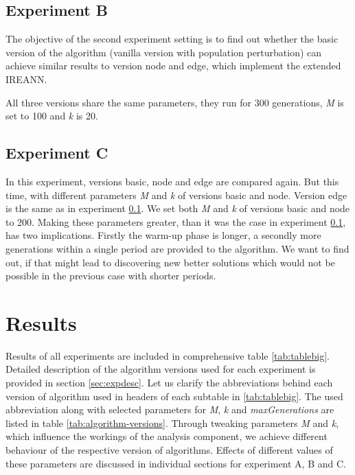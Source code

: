 \documentclass[twoside]{ctuthesis}
\theoremstyle{plain}
\theoremstyle{definition}
\theoremstyle{note}
\begin{document}
\subsection{Experiment B}
\label{sec:expb}

The objective of the second experiment setting is to find out whether the basic version of the algorithm (vanilla version with population perturbation) can achieve similar results to version node and edge, which implement the extended IREANN.

All three versions share the same parameters, they run for 300 generations, \emph{M} is set to 100 and \emph{k} is 20.

\subsection{Experiment C}

In this experiment, versions basic, node and edge are compared again. But this time, with different parameters \emph{M} and \emph{k} of versions basic and node. Version edge is the same as in experiment \ref{sec:expb}. We set both \emph{M} and \emph{k} of versions basic and node to 200. Making these parameters greater, than it was the case in experiment \ref{sec:expb}, has two implications. Firstly the warm-up phase is longer, a secondly more generations within a single period are provided to the algorithm. We want to find out, if that might lead to discovering new better solutions which would not be possible in the previous case with shorter periods.



\section{Results}
\label{sec:results}

Results of all experiments are included in comprehensive table \ref{tab:tablebig}. Detailed description of the algorithm versions used for each experiment is provided in section \ref{sec:expdesc}.
Let us clarify the abbreviations behind each version of algorithm used in headers of each subtable in \ref{tab:tablebig}. The used abbreviation along with selected parameters for \emph{M}, \emph{k} and \emph{maxGenerations} are listed in table \ref{tab:algorithm-versions}. Through tweaking parameters \emph{M} and \emph{k}, which influence the workings of the analysis component, we achieve different behaviour of the respective version of algorithms. Effects of different values of these parameters are discussed in individual sections for experiment A, B and C.
\end{document}
